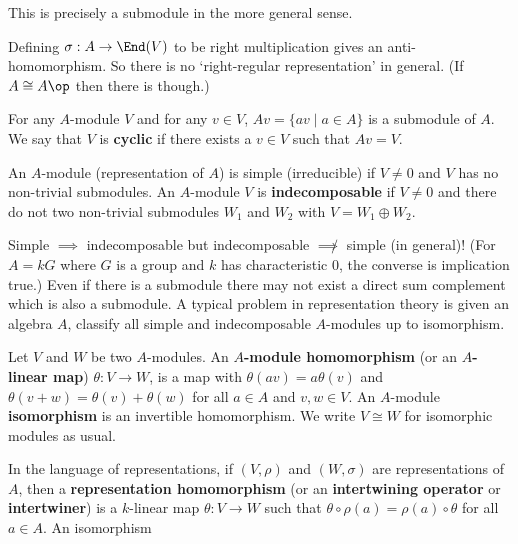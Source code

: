 \begin{rmk}
	This is precisely a submodule in the more general sense.
\end{rmk}

\begin{rmk}
	Defining $\sigma:A \to \End(V)$ to be right multiplication gives an anti-homomorphism.
	So there is no `right-regular representation' in general.
	(If $A \cong A\op$ then there is though.)
\end{rmk}

\begin{defn}
	For any $A$-module $V$ and for any $v \in V$, $Av = \{av \mid a \in A\}$ is a submodule of $A$.
	We say that $V$ is \textbf{cyclic} if there exists a $v \in V$ such that $Av=V$.
\end{defn}

\begin{defn}
	An $A$-module (representation of $A$) is simple (irreducible) if $V \neq 0$ and $V$ has no non-trivial submodules.
	An $A$-module $V$ is \textbf{indecomposable} if $V \neq 0$ and there do not two non-trivial submodules $W_1$ and $W_2$ with $V = W_1 \oplus W_2$.
\end{defn}

\begin{rmk}
	Simple $\implies$ indecomposable but indecomposable $\not\implies$ simple (in general)!
	(For $A=kG$ where $G$ is a group and $k$ has characteristic $0$, the converse is implication true.)
	Even if there is a submodule there may not exist a direct sum complement which is also a submodule.
	A typical problem in representation theory is given an algebra $A$, classify all simple and indecomposable $A$-modules up to isomorphism.
\end{rmk}

\begin{defn}
	Let $V$ and $W$ be two $A$-modules.
	An \textbf{$A$-module homomorphism} (or an \textbf{$A$-linear map}) $\theta:V \to W$, is a map with \@ $\theta(av)=a\theta(v)$ and $\theta(v+w)=\theta(v)+\theta(w)$ for all $a \in A$ and $v,w \in V$.
	An $A$-module \textbf{isomorphism} is an invertible homomorphism.
	We write $V \cong W$ for isomorphic modules as usual.
	
	In the language of representations, if $(V,\rho)$ and $(W,\sigma)$ are representations of $A$, then a \textbf{representation homomorphism} (or an \textbf{intertwining operator} or \textbf{intertwiner}) is a $k$-linear map $\theta: V \to W$ such that $\theta \circ \rho(a) = \rho(a) \circ \theta$ for all $a \in A$.
	An isomorphism
\end{defn}

